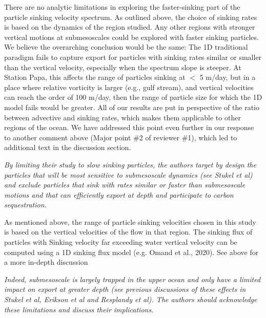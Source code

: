 \documentclass[12pt,letter]{article}
\begin{document}
{\color{blue}
	There are no analytic limitations in exploring the faster-sinking part of the particle sinking velocity spectrum. As outlined above, the choice of sinking rates is based on the dynamics of the region studied. Any other regions with stronger vertical motions at submesoscales could be explored with faster sinking particles. We believe the overarching conclusion would be the same: The 1D traditional paradigm fails to capture export for particles with sinking rates similar or smaller than the vertical velocity, especially when the spectrum slope is steeper. At Station Papa, this affects the range of particles sinking at $<$ 5 m/day, but in a place where relative vorticity is larger (e.g., gulf stream), and vertical velocities can reach the order of 100 m/day, then the range of particle size for which the 1D model fails would be greater. All of our results are put in perspective of the ratio between advective and sinking rates, which makes them applicable to other regions of the ocean. We have addressed this point even further in our response to another comment above (Major point \#2 of reviewer \#1), which led to additional text in the discussion section.\\}

\textit{By limiting their study to slow sinking particles, the authors target by design the particles that will be most sensitive to submesoscale dynamics (see Stukel et al) and exclude particles that sink with rates similar or faster than submesoscale motions and that can efficiently export at depth and participate to carbon sequestration.}

{\color{blue}
	As mentioned above, the range of particle sinking velocities chosen in this study is based on the vertical 
	velocities of the flow in that region. The sinking flux of particles with Sinking velocity far exceeding water vertical velocity can be computed using a 1D sinking flux model (e.g. Omand et al., 2020). See above for a more in-depth discussion\\}

 \textit{Indeed, submesoscale is largely trapped in the upper ocean and only have a limited impact on export at greater depth (see previous discussions of these effects in Stukel et al, Erikson et al and Resplandy et al). The authors should acknowledge these limitations and discuss their implications.\\}
\end{document}
